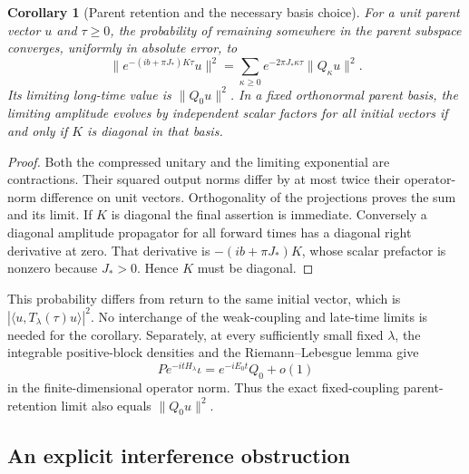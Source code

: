\documentclass[11pt]{article}
\newtheorem{corollary}[theorem]{Corollary}
\theoremstyle{remark}
\begin{document}
\begin{corollary}[Parent retention and the necessary basis choice]
\label{cor:v20v52-retention}
For a unit parent vector \(u\) and \(\tau\geq0\), the probability
of remaining somewhere in the parent subspace converges, uniformly
in absolute error, to
\[
 \|e^{-(ib+\pi J_*)K\tau}u\|^2
       =\sum_{\kappa\geq0}e^{-2\pi J_*\kappa\tau}\|Q_\kappa u\|^2 .
\]
Its limiting long-time value is \(\|Q_0u\|^2\).
In a fixed orthonormal parent basis, the limiting amplitude
evolves by independent scalar factors for all initial vectors
if and only if \(K\) is diagonal in that basis.
\end{corollary}
\begin{proof}
Both the compressed unitary and the limiting exponential are
contractions.  Their squared output norms differ by at most
twice their operator-norm difference on unit vectors.
Orthogonality of the projections proves the sum and its limit.
If \(K\) is diagonal the final assertion is immediate.
Conversely a diagonal amplitude propagator for all forward times
has a diagonal right derivative at zero.  That derivative is
\(-(ib+\pi J_*)K\), whose scalar prefactor is nonzero because
\(J_*>0\).  Hence \(K\) must be diagonal.
\end{proof}

This probability differs from return to the same initial vector,
which is \(|\langle u,T_\lambda(\tau)u\rangle|^2\).
No interchange of the weak-coupling and late-time limits is needed
for the corollary.  Separately, at every sufficiently small fixed
\(\lambda\), the integrable positive-block densities and the
Riemann--Lebesgue lemma give
\[
 P e^{-itH_\lambda}\iota=e^{-iE_0t}Q_0+o(1)
\]
in the finite-dimensional operator norm.  Thus the exact
fixed-coupling parent-retention limit also equals \(\|Q_0u\|^2\).

\subsection{An explicit interference obstruction}
\end{document}
